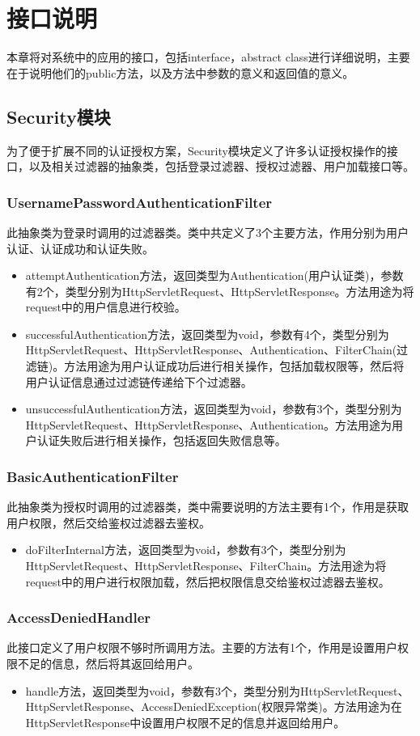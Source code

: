 \chapter{接口说明}
本章将对系统中的应用的接口，包括interface，abstract class进行详细说明，主要在于说明他们的public方法，以及方法中参数的意义和返回值的意义。

\section{Security模块}
为了便于扩展不同的认证授权方案，Security模块定义了许多认证授权操作的接口，以及相关过滤器的抽象类，包括登录过滤器、授权过滤器、用户加载接口等。
\subsection{UsernamePasswordAuthenticationFilter}
此抽象类为登录时调用的过滤器类。类中共定义了3个主要方法，作用分别为用户认证、认证成功和认证失败。
\begin{itemize}
    \item attemptAuthentication方法，返回类型为Authentication(用户认证类)，参数有2个，类型分别为HttpServletRequest、HttpServletResponse。方法用途为将request中的用户信息进行校验。
    \item successfulAuthentication方法，返回类型为void，参数有4个，类型分别为HttpServletRequest、HttpServletResponse、Authentication、FilterChain(过滤链)。方法用途为用户认证成功后进行相关操作，包括加载权限等，然后将用户认证信息通过过滤链传递给下个过滤器。
    \item unsuccessfulAuthentication方法，返回类型为void，参数有3个，类型分别为HttpServletRequest、HttpServletResponse、Authentication。方法用途为用户认证失败后进行相关操作，包括返回失败信息等。
\end{itemize}

\subsection{BasicAuthenticationFilter}
此抽象类为授权时调用的过滤器类，类中需要说明的方法主要有1个，作用是获取用户权限，然后交给鉴权过滤器去鉴权。
\begin{itemize}
    \item doFilterInternal方法，返回类型为void，参数有3个，类型分别为HttpServletRequest、HttpServletResponse、FilterChain。方法用途为将request中的用户进行权限加载，然后把权限信息交给鉴权过滤器去鉴权。
\end{itemize}

\subsection{AccessDeniedHandler}
此接口定义了用户权限不够时所调用方法。主要的方法有1个，作用是设置用户权限不足的信息，然后将其返回给用户。
\begin{itemize}
    \item handle方法，返回类型为void，参数有3个，类型分别为HttpServletRequest、HttpServletResponse、AccessDeniedException(权限异常类)。方法用途为在HttpServletResponse中设置用户权限不足的信息并返回给用户。
\end{itemize}

